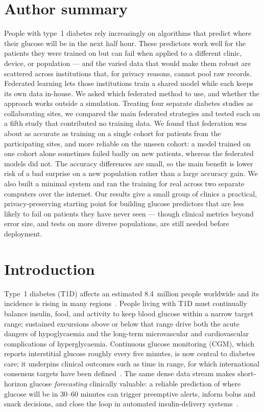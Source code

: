 \documentclass[10pt,letterpaper]{article}
\begin{document}
\section*{Author summary}
People with type~1 diabetes rely increasingly on algorithms that predict where
their glucose will be in the next half hour. These predictors work well for the
patients they were trained on but can fail when applied to a different clinic,
device, or population --- and the varied data that would make them robust are
scattered across institutions that, for privacy reasons, cannot pool raw
records. Federated learning lets those institutions train a shared model while
each keeps its own data in-house. We asked which federated method to use, and
whether the approach works outside a simulation. Treating four separate
diabetes studies as collaborating sites, we compared the main federated
strategies and tested each on a fifth study that contributed no training data.
We found that federation was about as accurate as training on a single cohort
for patients from the participating sites, and more reliable on the unseen
cohort: a model trained on one cohort alone sometimes failed badly on new
patients, whereas the federated models did not. The accuracy differences are
small, so the main benefit is lower risk of a bad surprise on a new population
rather than a large accuracy gain. We also built a minimal system and ran the
training for real across two separate computers over the internet. Our results
give a small group of clinics a practical, privacy-preserving starting point for
building glucose predictors that are less likely to fail on patients they have
never seen --- though clinical metrics beyond error size, and tests on more
diverse populations, are still needed before deployment.

\clearpage
{}
\linenumbers

\section*{Introduction}

Type~1 diabetes (T1D) affects an estimated 8.4~million people worldwide and its
incidence is rising in many regions~\cite{idf2021,gregory2022t1dindex}. People living with T1D must
continually balance insulin, food, and activity to keep blood glucose within a
narrow target range; sustained excursions above or below that range drive both
the acute dangers of hypoglycaemia and the long-term microvascular and
cardiovascular complications of hyperglycaemia. Continuous glucose monitoring
(CGM), which reports interstitial glucose roughly every five minutes, is now
central to diabetes care; it underpins clinical outcomes such as time in range,
for which international consensus targets have been defined~\cite{battelino2019tir}. The same dense data stream makes
short-horizon glucose \emph{forecasting} clinically valuable: a reliable
prediction of where glucose will be in 30--60 minutes can trigger preemptive
alerts, inform bolus and snack decisions, and close the loop in automated
insulin-delivery systems~\cite{vettoretti2020advanced,bekiari2018ap}.
\end{document}
